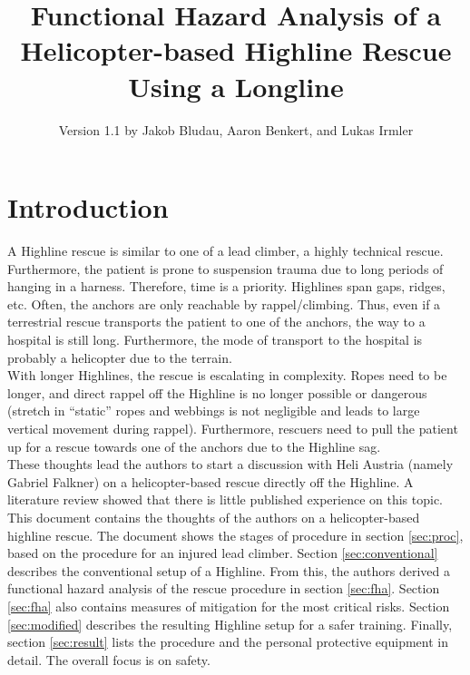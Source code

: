 \documentclass[a4paper,10pt]{scrartcl}
\title{Functional Hazard Analysis of a Helicopter-based Highline Rescue Using a Longline}
\author{Version 1.1 by Jakob Bludau, Aaron Benkert, and Lukas Irmler}
\begin{document}
\maketitle

\tableofcontents

\section{Introduction}
\label{sec:intro}
A Highline rescue is similar to one of a lead climber, a highly technical rescue. Furthermore, the patient is prone to suspension trauma due to long periods of hanging in a harness. Therefore, time is a priority.
Highlines span gaps, ridges, etc. Often, the anchors are only reachable by rappel/climbing. Thus, even if a terrestrial rescue transports the patient to one of the anchors, the way to a hospital is still long. Furthermore, the mode of transport to the hospital is probably a helicopter due to the terrain.\\

With longer Highlines, the rescue is escalating in complexity. Ropes need to be longer, and direct rappel off the Highline is no longer possible or dangerous (stretch in “static” ropes and webbings is not negligible and leads to large vertical movement during rappel). Furthermore, rescuers need to pull the patient up for a rescue towards one of the anchors due to the Highline sag. \\

These thoughts lead the authors to start a discussion with Heli Austria (namely Gabriel Falkner) on a helicopter-based rescue directly off the Highline. A literature review showed that there is little published experience on this topic.\\

This document contains the thoughts of the authors on a helicopter-based highline rescue. The document shows the stages of procedure in section \ref{sec:proc}, based on the procedure for an injured lead climber. Section \ref{sec:conventional} describes the conventional setup of a Highline. From this, the authors derived a functional hazard analysis of the rescue procedure in section \ref{sec:fha}. Section \ref{sec:fha} also contains measures of mitigation for the most critical risks. Section \ref{sec:modified} describes the resulting Highline setup for a safer training. Finally, section \ref{sec:result} lists the procedure and the personal protective equipment in detail. The overall focus is on safety.
\end{document}
